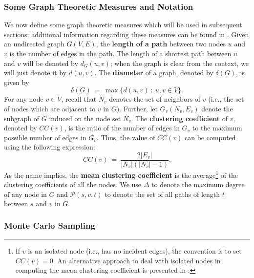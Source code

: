 \subsubsection{Some Graph Theoretic Measures and Notation}
\label{sec:graphdefs}

We now define some graph theoretic measures which will be used
in subsequent sections;
additional information regarding these measures can be
found in \cite{newman_2010}.
Given an undirected graph $G(V,E)$, the \textbf{length of a path} between two
nodes $u$ and $v$ is the number of edges in the path.
The length of a shortest path between $u$ and $v$ will be denoted by
$d_G(u,v)$; when the graph is clear from the context, we will just denote it by $d(u, v)$.
The \textbf{diameter} of a graph, denoted by $\delta(G)$, is given by
\[
\delta(G) ~=~ \max \{d(u,v) ~:~ u,v \in V\}.
\]
For any node $v \in V$, recall that $N_v$ denotes the set of neighbors of $v$
(i.e., the set of nodes which are adjacent to $v$ in $G$).
Further, let $G_v(N_v, E_v)$ denote the subgraph of $G$ induced on
the node set $N_v$.
The \textbf{clustering coefficient} of $v$, denoted by $CC(v)$, 
is the ratio of the number of edges in $G_v$ to the maximum possible
number of edges in $G_v$.
Thus, the value of $CC(v)$ can be computed using the following expression:
\[
CC(v) ~=~ \frac{2|E_v|}{|N_v|(|N_v| - 1)}.
\]
As the name implies, the \textbf{mean clustering coefficient} 
is the average\footnote{
If $v$ is an isolated node (i.e., has no incident edges), the convention
is to set $CC(v) = 0$.
An alternative approach to deal with isolated nodes in
computing the mean clustering coefficient is presented in \cite{Kaiser-2008}.
}
of the clustering coefficients of all the nodes.
We use $\Delta$ to denote the maximum degree of any node in $G$
and $\mathcal{P}(s, v, t)$ to
denote the set of all paths of length $t$ between $s$ and $v$ in $G$.

\subsubsection{Monte Carlo Sampling}
\label{sss:monte_carlo}

